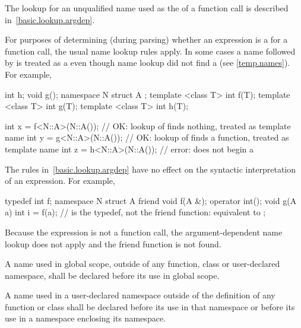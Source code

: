 \pnum
The lookup for an unqualified name used as the
 of a function call is described
in~\ref{basic.lookup.argdep}.
\begin{note}
For purposes of determining
(during parsing) whether an expression is a
 for a function call, the usual name lookup
rules apply.
In some cases
a name followed by \tcode{<} is treated as a 
even though name lookup did not find a 
(see \ref{temp.names}).
For example,
\begin{codeblock}
int h;
void g();
namespace N {
  struct A {};
  template <class T> int f(T);
  template <class T> int g(T);
  template <class T> int h(T);
}

int x = f<N::A>(N::A());        // OK: lookup of  finds nothing,  treated as template name
int y = g<N::A>(N::A());        // OK: lookup of  finds a function,  treated as template name
int z = h<N::A>(N::A());        // error:  does not begin a 
\end{codeblock}

The rules in~\ref{basic.lookup.argdep} have no effect on
the syntactic interpretation of an expression. For example,
\begin{codeblock}
typedef int f;
namespace N {
  struct A {
    friend void f(A &);
    operator int();
    void g(A a) {
      int i = f(a);             //  is the typedef, not the friend function: equivalent to 
    }
  };
}
\end{codeblock}
Because the expression is not a function call, the argument-dependent
name lookup does not apply and the friend
function  is not found.
\end{note}

\pnum
A name used in global scope, outside of any function, class or
user-declared namespace, shall be declared before its use in global
scope.

\pnum
A name used in a user-declared namespace outside of the definition of
any function or class shall be declared before its use in that namespace
or before its use in a namespace enclosing its namespace.

